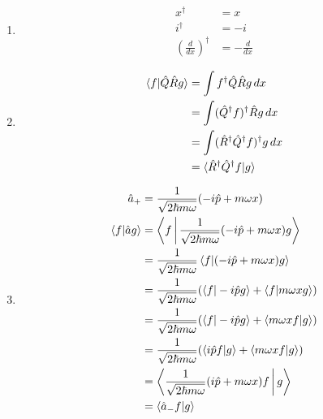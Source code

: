 \documentclass{article}
\begin{document}
\subsection{}

\begin{enumerate}
  \item

        \begin{align*}
          x^\dagger                            & = x              \\
          i^\dagger                            & = -i             \\
          \left( \frac{d}{d x} \right)^\dagger & = -\frac{d}{d x}
        \end{align*}

  \item

        \begin{align*}
          \braket{f | \hat{Q} \hat{R} g} & = \int f^\dagger \hat{Q} \hat{R} g \,d x                   \\
                                         & = \int (\hat{Q}^\dagger f)^\dagger \hat{R} g \,d x         \\
                                         & = \int (\hat{R}^\dagger \hat{Q}^\dagger f)^\dagger g \,d x \\
                                         & = \braket{\hat{R}^\dagger \hat{Q}^\dagger f | g}
        \end{align*}

  \item

        \begin{align*}
          \hat{a}_+              & = \frac{1}{\sqrt{2 \hbar m \omega}} (-i \hat{p} + m \omega x)                               \\
          \braket{f | \hat{a} g} & = \Braket{f | \frac{1}{\sqrt{2 \hbar m \omega}} (-i \hat{p} + m \omega x) g}                \\
                                 & = \frac{1}{\sqrt{2 \hbar m \omega}} \braket{f | (-i \hat{p} + m \omega x) g}                \\
                                 & = \frac{1}{\sqrt{2 \hbar m \omega}} (\braket{f | -i \hat{p} g} + \braket{f | m \omega x g}) \\
                                 & = \frac{1}{\sqrt{2 \hbar m \omega}} (\braket{f | -i \hat{p} g} + \braket{m \omega x f | g}) \\
                                 & = \frac{1}{\sqrt{2 \hbar m \omega}} (\braket{i \hat{p} f | g} + \braket{m \omega x f | g})  \\
                                 & = \Braket{\frac{1}{\sqrt{2 \hbar m \omega}} (i \hat{p} + m \omega x) f | g}                 \\
                                 & = \braket{\hat{a}_- f | g}
        \end{align*}
\end{enumerate}
\end{document}
